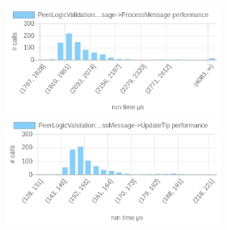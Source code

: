 \documentclass{article}
\begin{document}
\includegraphics[width=7cm]{images/mumbai/chartPeerLogicValidation_3A_3AProcessMessages-_3EProcessMessage-_3EProcessMessage.png}
\includegraphics[width=7cm]{images/mumbai/chartPeerLogicValidation_3A_3AProcessMessages-_3EProcessMessage-_3EProcessMessage-_3EUpdateTip.png}




\end{document}
